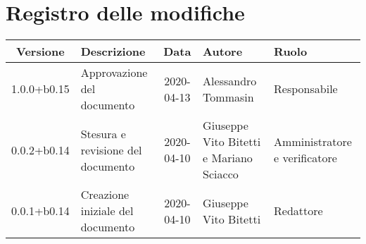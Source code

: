 \section*{Registro delle modifiche}

\begin{center}
	\begin{longtable}{|c|p{3.5cm}|c|p{3cm}|p{3cm}|}
	\hline
	\rowcolor{lighter-grayer}
	\textbf{Versione} & \textbf{Descrizione} & \textbf{Data} & \textbf{Autore} & \textbf{Ruolo} \\
	\hline
	\endfirsthead

	1.0.0+b0.15 & Approvazione del documento & 2020-04-13 & Alessandro Tommasin & Responsabile \\
	\hline
	0.0.2+b0.14 & Stesura e revisione del documento & 2020-04-10 & Giuseppe Vito Bitetti e Mariano Sciacco & Amministratore e verificatore \\
	\hline
	0.0.1+b0.14 & Creazione iniziale del documento & 2020-04-10 & Giuseppe Vito Bitetti & Redattore \\
	\hline

	\end{longtable}
\end{center}
